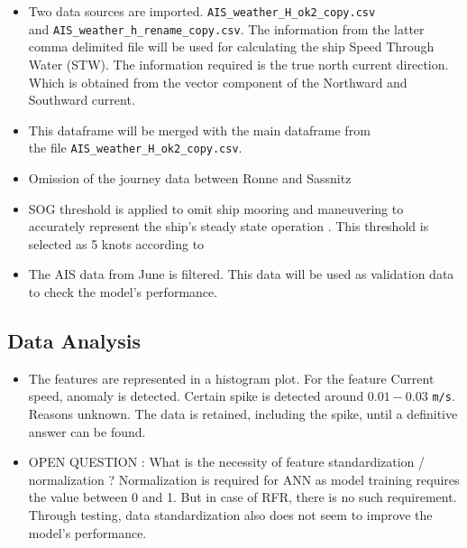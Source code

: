 \begin{itemize}
    \item Two data sources are imported. {\tt AIS\_weather\_H\_ok2\_copy.csv} \\ and {\tt AIS\_weather\_h\_rename\_copy.csv}. The information from the latter comma delimited 
    file will be used for calculating the ship Speed Through Water (STW).  
    The information required is the true north current direction. Which is obtained from the vector component of the Northward and Southward current.
    \item This dataframe will be merged with the main dataframe from \\ the file {\tt AIS\_weather\_H\_ok2\_copy.csv}.
    \item Omission of the journey data between Ronne and Sassnitz
    \item SOG threshold is applied to omit ship mooring and maneuvering to accurately represent the ship's steady state operation 
    \cite{Abebe.2020,BalBesikci.2016,Gkerekos.2019,Yang.2020}. This threshold is selected as 5 knots according to \cite{Abebe.2020}
    \item The AIS data from June is filtered. This data will be used as validation data to check the model's performance.
\end{itemize}
 
\subsection{Data Analysis}
\begin{itemize}
    \item The features are represented in a histogram plot. For the feature Current speed, anomaly is detected. Certain spike is detected around $0.01 - 0.03$ \verb|m/s|. Reasons unknown. The data is retained, including the spike, until a definitive answer can be found.
    \item OPEN QUESTION : What is the necessity of feature standardization / normalization ? Normalization is required for ANN as model training requires the value between 0 and 1. But in case of RFR, there is no such requirement. Through testing, data standardization also does not seem to improve the model's performance. 
\end{itemize}




